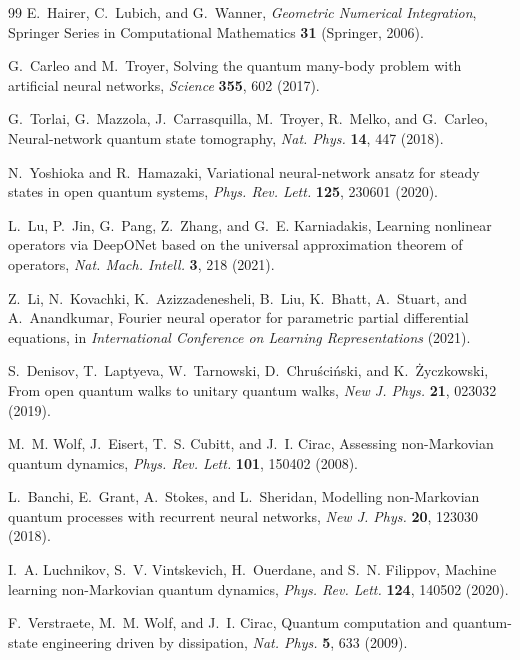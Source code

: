 \documentclass[twocolumn,aps,prxquantum,superscriptaddress,nofootinbib,floatfix,longbibliography]{revtex4-2}
\begin{document}
\begin{thebibliography}{99}
E.~Hairer, C.~Lubich, and G.~Wanner, \emph{Geometric Numerical Integration}, Springer Series in Computational Mathematics \textbf{31} (Springer, 2006).

G.~Carleo and M.~Troyer, Solving the quantum many-body problem with artificial neural networks, \emph{Science} \textbf{355}, 602 (2017).

G.~Torlai, G.~Mazzola, J.~Carrasquilla, M.~Troyer, R.~Melko, and G.~Carleo, Neural-network quantum state tomography, \emph{Nat. Phys.} \textbf{14}, 447 (2018).

N.~Yoshioka and R.~Hamazaki, Variational neural-network ansatz for steady states in open quantum systems, \emph{Phys. Rev. Lett.} \textbf{125}, 230601 (2020).

L.~Lu, P.~Jin, G.~Pang, Z.~Zhang, and G.~E. Karniadakis, Learning nonlinear operators via DeepONet based on the universal approximation theorem of operators, \emph{Nat. Mach. Intell.} \textbf{3}, 218 (2021).

Z.~Li, N.~Kovachki, K.~Azizzadenesheli, B.~Liu, K.~Bhatt, A.~Stuart, and A.~Anandkumar, Fourier neural operator for parametric partial differential equations, in \emph{International Conference on Learning Representations} (2021).

S.~Denisov, T.~Laptyeva, W.~Tarnowski, D.~Chru\'sci\'nski, and K.~\.Zyczkowski, From open quantum walks to unitary quantum walks, \emph{New J. Phys.} \textbf{21}, 023032 (2019).

M.~M. Wolf, J.~Eisert, T.~S. Cubitt, and J.~I. Cirac, Assessing non-Markovian quantum dynamics, \emph{Phys. Rev. Lett.} \textbf{101}, 150402 (2008).

L.~Banchi, E.~Grant, A.~Stokes, and L.~Sheridan, Modelling non-Markovian quantum processes with recurrent neural networks, \emph{New J. Phys.} \textbf{20}, 123030 (2018).

I.~A. Luchnikov, S.~V. Vintskevich, H.~Ouerdane, and S.~N. Filippov, Machine learning non-Markovian quantum dynamics, \emph{Phys. Rev. Lett.} \textbf{124}, 140502 (2020).

F.~Verstraete, M.~M. Wolf, and J.~I. Cirac, Quantum computation and quantum-state engineering driven by dissipation, \emph{Nat. Phys.} \textbf{5}, 633 (2009).


\end{thebibliography}
\end{document}
